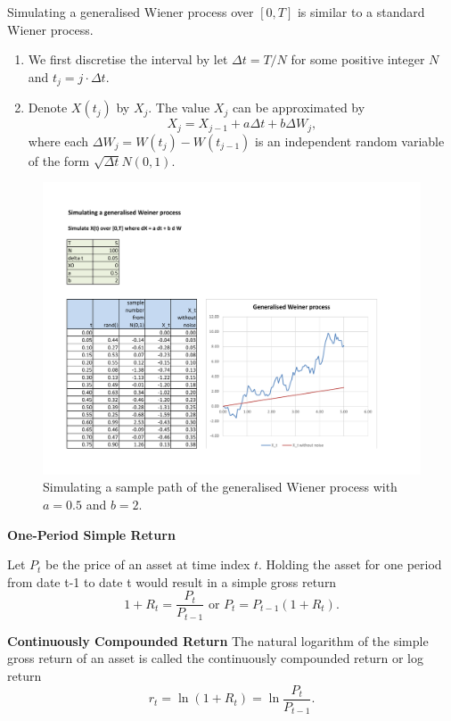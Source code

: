 \documentclass[
]{book}
\theoremstyle{definition}
\theoremstyle{definition}
\theoremstyle{definition}
\theoremstyle{definition}
\theoremstyle{remark}
\begin{document}
Simulating a generalised Wiener process over \([0,T]\) is similar to a
standard Wiener process.

\begin{enumerate}
\def\labelenumi{\arabic{enumi}.}
\item
  We first discretise the interval by let \(\Delta t = T/N\) for some
  positive integer \(N\) and \(t_j = j \cdot \Delta t\).
\item
  Denote \(X(t_j)\) by \(X_j\). The value \(X_j\) can be approximated by
  \[X_j = X_{j-1} + a \Delta t + b \Delta W_j,\] where each
  \(\Delta W_j = W(t_j) - W(t_{j-1})\) is an independent random variable
  of the form \(\sqrt{\Delta t} N(0,1)\).
\end{enumerate}

\begin{figure}
\hypertarget{fig:GW}{%
\centering
\includegraphics[width=8in,height=\textheight]{GW2.pdf}
\caption{Simulating a sample path of the generalised Wiener process with
\(a =0.5\) and \(b = 2\).}\label{fig:GW}
}
\end{figure}

\textbf{One-Period Simple Return}

Let \(P_t\) be the price of an asset at time index \(t\). Holding the asset
for one period from date t-1 to date t would result in a simple gross
return
\[1 + R_t =  \frac{P_t}{P_{t-1}}   \text{    or     }    P_t = P_{t-1} (1 + R_t).\]

\textbf{Continuously Compounded Return} The natural logarithm of the simple
gross return of an asset is called the continuously compounded return or
log return \[r_t = \ln(1 + R_t) = \ln\frac{P_t}{P_{t-1}}.\]
\end{document}
